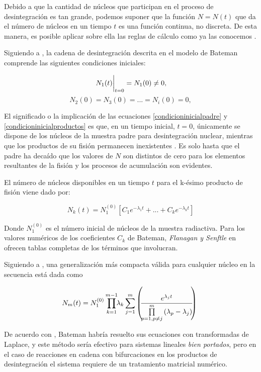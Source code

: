 \noindent Debido a que la cantidad de núcleos que participan en el proceso de desintegración es tan grande, podemos suponer que la función $N=N(t)$ que da el número de núcleos en un tiempo $t$ es una función continua, no discreta. De esta manera, es posible aplicar sobre ella las reglas de cálculo como ya las conocemos \cite{Podgorsak.2016}. 

\noindent Siguiendo a \cite{Podgorsak.2016}, la cadena de desintegración descrita en el modelo de Bateman comprende las siguientes condiciones iniciales:

\begin{equation}
    \eval{N_1(t)}_{t=0}=N_1(0)\neq 0,\label{condicioninicialpadre}
\end{equation}
\begin{equation}
    N_2(0)=N_3(0)=...=N_i(0)=0, \label{condicioninicialproductos}
\end{equation}

El significado o la implicación de las ecuaciones \ref{condicioninicialpadre} y \ref{condicioninicialproductos} es que, en un tiempo inicial, $t=0$, únicamente se dispone de los núcleos de la muestra padre para desintegración nuclear, mientras que los productos de su fisión permanecen inexistentes \cite{Podgorsak.2016}. Es solo hasta que el padre ha decaído que los valores de $N$ son distintos de cero para los elementos resultantes de la fisión y los procesos de acumulación \cite{Sanctis.2016} son evidentes. 

El número de núcleos disponibles en un tiempo $t$ para el k-ésimo producto de fisión viene dado por:

\begin{equation}
        N_k(t)=N_1^{(0)} \left[C_1 e^{-\lambda_1 t}+...+C_k e^{-\lambda_k t}\right] \label{iesimonucleo}
\end{equation}

\noindent Donde $N_1^{(0)}$ es el número inicial de núcleos de la muestra radiactiva. Para los valores numéricos de los coeficientes $C_k$ de Bateman, \textit{Flanagan y Senftle} en \cite{Flanagan1954} ofrecen tablas completas de los términos que involucran.

Siguiendo a \cite{Loch.2013}, una generalización más compacta válida para cualquier núcleo en la secuencia está dada como

\begin{equation}
\!\!\small N_m(t)=N_1^{(0)} \prod_{k=1}^{m-1}\!\!\lambda_k\sum_{j=1}^{m}\left(\!\!\frac{e^{\lambda_j t}}{\prod\limits_{p=1, p\neq j}^{m}\left(\lambda_p-\lambda_j\right)}\!\!\right) \label{batemangeneral}
\end{equation}

De acuerdo con \cite{Pratiwi.2021}, Bateman habría resuelto sus ecuaciones con transformadas de Laplace, y este método sería efectivo para sistemas lineales \textit{bien portados}, pero en el caso de reacciones en cadena con bifurcaciones en los productos de desintegración el sistema requiere de un tratamiento matricial numérico. 